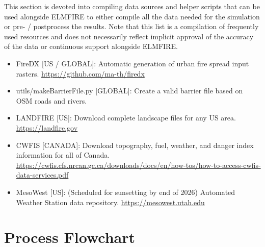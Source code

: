 This section is devoted into compiling data sources and helper scripts that can be used alongside ELMFIRE to either compile all the data needed for the simulation or pre- / postprocess the results. Note that this list is a compilation of frequently used resources and does not necessarily reflect implicit approval of the accuracy of the data or continuous support alongside ELMFIRE. 

\begin{itemize}
    \item FireDX [US / GLOBAL]: Automatic generation of urban fire spread input rasters. \url{https://github.com/ma-th/firedx}
    \item utils/makeBarrierFile.py [GLOBAL]: Create a valid barrier file based on OSM roads and rivers. 
    \item LANDFIRE [US]: Download complete landscape files for any US area. \url{https://landfire.gov}
    \item CWFIS [CANADA]: Download topography, fuel, weather, and danger index information for all of Canada. \url{https://cwfis.cfs.nrcan.gc.ca/downloads/docs/en/how-tos/how-to-access-cwfis-data-services.pdf}
    \item MesoWest [US]: (Scheduled for sunsetting by end of 2026) Automated Weather Station data repository. \url{https://mesowest.utah.edu}
\end{itemize}

\section{Process Flowchart}

